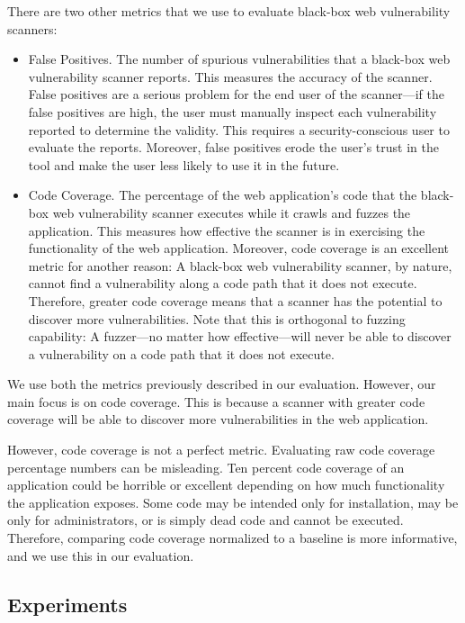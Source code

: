 There are two other metrics that we use to evaluate black-box web vulnerability
scanners:
\begin{itemize}
  \item{}False Positives. The number of spurious vulnerabilities that a
    black-box web vulnerability scanner reports. This measures the accuracy of
    the scanner. False positives are a serious problem for the end user of the
    scanner---if the false positives are high, the user must manually inspect
    each vulnerability reported to determine the validity. This requires a
    security-conscious user to evaluate the reports. Moreover, false positives
    erode the user's trust in the tool and make the user less likely to use
    it in the future.

  \item{}Code Coverage. The percentage of the web application's code that the
    black-box web vulnerability scanner executes while it crawls and fuzzes the
    application. This measures how effective the scanner is in exercising the
    functionality of the web application. Moreover, code coverage is an
    excellent metric for another reason: A black-box web vulnerability scanner,
    by nature, cannot find a vulnerability along a code path that it does not
    execute. Therefore, greater code coverage means that a scanner has the
    potential to discover more vulnerabilities. Note that this is orthogonal to
    fuzzing capability: A fuzzer---no matter how effective---will never be able
    to discover a vulnerability on a code path that it does not execute.
\end{itemize}

We use both the metrics previously described in our evaluation. However, our main focus is on code
coverage. This is because a scanner with greater code coverage will be able to
discover more vulnerabilities in the web application.

However, code coverage is not a perfect metric. Evaluating raw code coverage
percentage numbers can be misleading. Ten percent code coverage of an
application could be horrible or excellent depending on how much functionality
the application exposes. Some code may be intended only for installation, may
be only for administrators, or is simply dead code and cannot be executed.
Therefore, comparing code coverage normalized to a baseline is more
informative, and we use this in our evaluation.

\subsection{Experiments}

